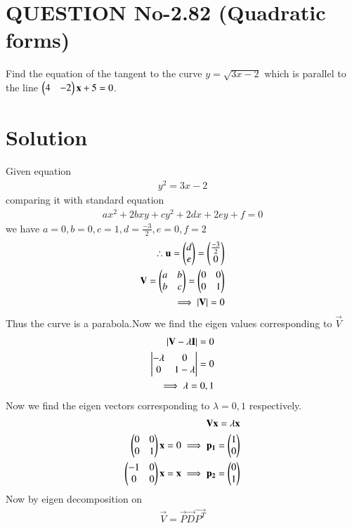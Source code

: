 \documentclass[journal,12pt,twocolumn]{IEEEtran}
\begin{document}
%
\section{QUESTION No-2.82 (Quadratic forms)}
\item Find the equation of the tangent to the curve $y=\sqrt{3x-2}$ which is parallel to the line $\begin{pmatrix}4&-2\end{pmatrix}\mathbf{x} + 5 = 0$.

%

\section{Solution}
Given equation
\begin{align}
    y^2 = 3x-2
\end{align}
comparing it with standard equation
\begin{align}
    ax^2+2bxy+cy^2+2dx+2ey+f=0
\end{align}
we have $a=0,b=0,c=1,d=\frac{-3}{2},e=0,f=2$
\begin{align}
\therefore \mathbf{u}=\begin{pmatrix}d \\ e\end{pmatrix}=\begin{pmatrix}\frac{-3}{2} \\ 0\end{pmatrix}
\\
\mathbf{V} = \begin{pmatrix}a&b \\ b&c\end{pmatrix}=\begin{pmatrix}0&0 \\ 0&1\end{pmatrix}
\\
\implies |\mathbf{V}|=0
\end{align}
Thus the curve is a parabola.Now we find the eigen values corresponding to $\vec{V}$
\begin{align}
    |\mathbf{V}-\lambda\mathbf{I}| = 0
    \\
    \begin{vmatrix}-\lambda&0 \\ 0&1-\lambda\end{vmatrix}=0
    \\
    \implies \lambda= 0,1
\end{align}
Now we find the eigen vectors corresponding to $\lambda= 0,1$ respectively.
\begin{align}
    \mathbf{V}\mathbf{x} = \lambda\mathbf{x}
    \\
    \begin{pmatrix}0&0 \\ 0&1\end{pmatrix}\mathbf{x} = 0\implies \mathbf{p_{1}}= \begin{pmatrix}1 \\ 0\end{pmatrix}
    \\
    \begin{pmatrix}-1&0 \\ 0&0\end{pmatrix}\mathbf{x} = \mathbf{x}\implies \mathbf{p_{2}}= \begin{pmatrix}0 \\ 1\end{pmatrix}
\end{align}
Now by eigen decomposition on 
\begin{align}
    \vec{V} = \vec{P}\vec{D}\vec{P^T}
\end{align}
\end{document}
